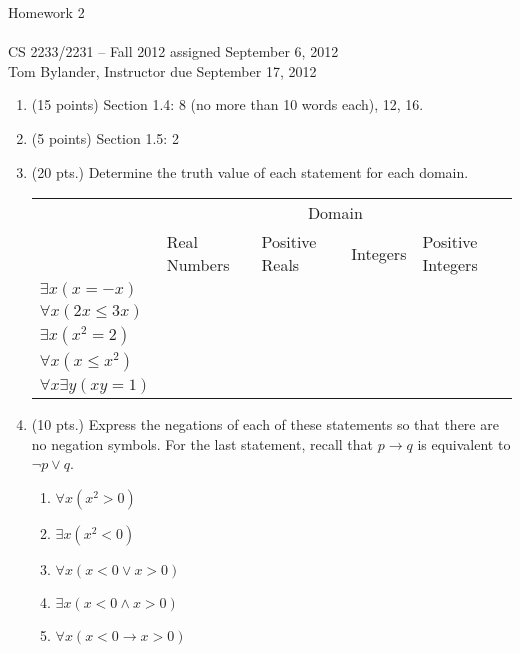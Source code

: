 \documentclass[12pt,fleqn]{article}
\begin{document}
\setcounter{page}{1}
\thispagestyle{empty}

\begin{center}
\LARGE
Homework 2 \\
\normalsize 
\ \\
CS 2233/2231 -- Fall 2012 \hfill assigned September 6, 2012 \\
Tom Bylander, Instructor \hfill due September 17, 2012
\end{center}

\normalsize

\begin{enumerate}

\item (15 points) Section 1.4: 8 (no more than 10 words each), 12,
  16.

\item (5 points) Section 1.5: 2

\item (20 pts.)
Determine the truth value of each statement for each domain.

\begin{center}
\begin{tabular}{l|l|l|l|l}
 & \multicolumn{4}{c}{Domain} \\
 & Real Numbers & Positive Reals & Integers & Positive Integers \\ \hline
$\exists x (x = -x)$ & & & & \\
$\forall x (2x \leq 3x)$ & & & & \\
$\exists x (x^2 = 2)$ & & & & \\
$\forall x (x \leq x^2)$ & & & & \\
$\forall x \exists y (xy = 1)$ & & & &
\end{tabular}
\end{center}

\item (10 pts.) Express the negations of each of these statements so
  that there are no negation symbols.  For the last statement, recall
  that $p \rightarrow q$ is equivalent to $\neg p \vee q$.

\begin{enumerate}
\item $\forall x (x^2 > 0)$
\item $\exists x (x^2 < 0)$
\item $\forall x (x < 0 \vee x > 0)$
\item $\exists x (x < 0 \wedge x > 0)$
\item $\forall x (x < 0 \rightarrow x > 0)$
\end{enumerate}


\end{enumerate}
\end{document}
